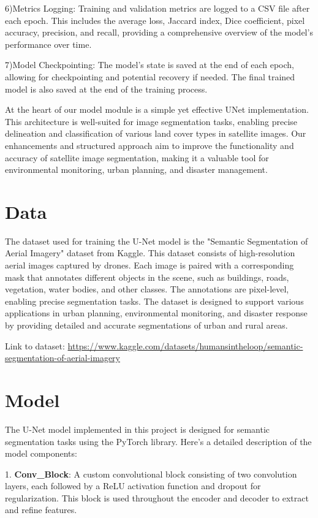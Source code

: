 \documentclass{article}
\begin{document}
6)Metrics Logging:
Training and validation metrics are logged to a CSV file after each epoch. This includes the average loss, Jaccard index, Dice coefficient, pixel accuracy, precision, and recall, providing a comprehensive overview of the model's performance over time.

7)Model Checkpointing:
The model's state is saved at the end of each epoch, allowing for checkpointing and potential recovery if needed. The final trained model is also saved at the end of the training process.

At the heart of our model module is a simple yet effective UNet implementation. This architecture is well-suited for image segmentation tasks, enabling precise delineation and classification of various land cover types in satellite images. Our enhancements and structured approach aim to improve the functionality and accuracy of satellite image segmentation, making it a valuable tool for environmental monitoring, urban planning, and disaster management.

\section{Data}
The dataset used for training the U-Net model is the "Semantic Segmentation of Aerial Imagery" dataset from Kaggle. This dataset consists of high-resolution aerial images captured by drones. Each image is paired with a corresponding mask that annotates different objects in the scene, such as buildings, roads, vegetation, water bodies, and other classes. The annotations are pixel-level, enabling precise segmentation tasks. The dataset is designed to support various applications in urban planning, environmental monitoring, and disaster response by providing detailed and accurate segmentations of urban and rural areas.

Link to dataset: \url{https://www.kaggle.com/datasets/humansintheloop/semantic-segmentation-of-aerial-imagery}

\section{Model}
The U-Net model implemented in this project is designed for semantic segmentation tasks using the PyTorch library. Here’s a detailed description of the model components:

1. \textbf{Conv\_Block}:
    A custom convolutional block consisting of two convolution layers, each followed by a ReLU activation function and dropout for regularization. This block is used throughout the encoder and decoder to extract and refine features.
\end{document}
